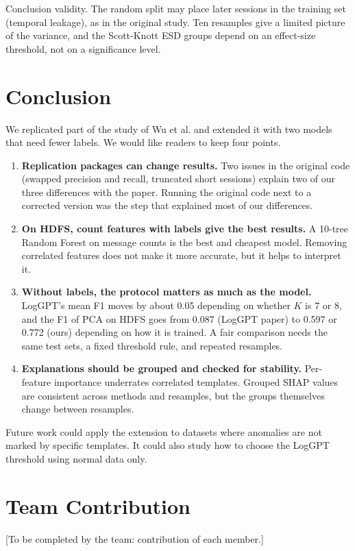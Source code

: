 \documentclass[10pt, conference]{IEEEtran}
\renewcommand{\paragraph}[1]{\noindent\textsf{#1}.}
\begin{document}
\paragraph{Conclusion validity} The random split may place later sessions in the training set (temporal leakage), as in the original study. Ten resamples give a limited picture of the variance, and the Scott-Knott ESD groups depend on an effect-size threshold, not on a significance level.

\section{Conclusion}
\label{sec:conclusion}

We replicated part of the study of Wu et al. and extended it with two models that need fewer labels. We would like readers to keep four points.

\begin{enumerate}
\item \textbf{Replication packages can change results.} Two issues in the original code (swapped precision and recall, truncated short sessions) explain two of our three differences with the paper. Running the original code next to a corrected version was the step that explained most of our differences.
\item \textbf{On HDFS, count features with labels give the best results.} A 10-tree Random Forest on message counts is the best and cheapest model. Removing correlated features does not make it more accurate, but it helps to interpret it.
\item \textbf{Without labels, the protocol matters as much as the model.} LogGPT's mean F1 moves by about 0.05 depending on whether $K$ is 7 or 8, and the F1 of PCA on HDFS goes from 0.087 (LogGPT paper) to 0.597 or 0.772 (ours) depending on how it is trained. A fair comparison needs the same test sets, a fixed threshold rule, and repeated resamples.
\item \textbf{Explanations should be grouped and checked for stability.} Per-feature importance underrates correlated templates. Grouped SHAP values are consistent across methods and resamples, but the groups themselves change between resamples.
\end{enumerate}

Future work could apply the extension to datasets where anomalies are not marked by specific templates. It could also study how to choose the LogGPT threshold using normal data only.

\section{Team Contribution}
\label{sec:contribution}
[To be completed by the team: contribution of each member.]

\balance


\end{document}
